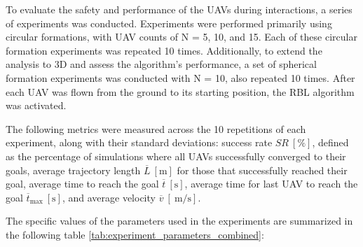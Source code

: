         To evaluate the safety and performance of the \ac{UAV}s during interactions, a series of experiments was conducted. 
        Experiments were performed primarily using circular formations, with \ac{UAV} counts of N = 5, 10, and 15. 
        Each of these circular formation experiments was repeated 10 times.
        Additionally, to extend the analysis to 3D and assess the algorithm's performance, a set of spherical formation experiments was conducted with N = 10, also repeated 10 times.
        After each \ac{UAV} was flown from the ground to its starting position, the \ac{RBL} algorithm was activated.    
        
        The following metrics were measured across the 10 repetitions of each experiment, along with their standard deviations: success rate \( SR \ [\%] \), defined as the percentage of simulations where all \ac{UAV}s successfully converged to their goals, 
        average trajectory length \( \overline{L} \ [\mathrm{m}] \) for those that successfully reached their goal, 
        average time to reach the goal \( \overline{t} \ [\mathrm{s}] \), average time for last \ac{UAV} to reach the goal \( \overline{t}_{\text{max}} \ [\mathrm{s}] \), and average velocity \( \overline{v} \ [\SI{}{\meter\per\second}] \).

        The specific values of the parameters used in the experiments are summarized in the following table \ref{tab:experiment_parameters_combined}:

